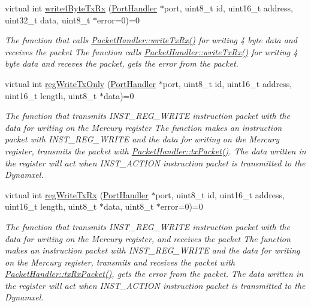 \begin{DoxyCompactItemize}
virtual int \hyperlink{classmercury_1_1_packet_handler_acd4df6583fcbaf872a4aba6623c9b084}{write4\+Byte\+Tx\+Rx} (\hyperlink{classmercury_1_1_port_handler}{Port\+Handler} $\ast$port, uint8\+\_\+t id, uint16\+\_\+t address, uint32\+\_\+t data, uint8\+\_\+t $\ast$error=0)=0
\begin{DoxyCompactList}\small\item\em The function that calls \hyperlink{classmercury_1_1_packet_handler_adf35a5000d465bd5426530e34a91a21d}{Packet\+Handler\+::write\+Tx\+Rx()} for writing 4 byte data and receives the packet  The function calls \hyperlink{classmercury_1_1_packet_handler_adf35a5000d465bd5426530e34a91a21d}{Packet\+Handler\+::write\+Tx\+Rx()} for writing 4 byte data and receves the packet,  gets the error from the packet. \end{DoxyCompactList}\item 
virtual int \hyperlink{classmercury_1_1_packet_handler_a0b0daaabd6473e14b2fbfbbf3260bc7b}{reg\+Write\+Tx\+Only} (\hyperlink{classmercury_1_1_port_handler}{Port\+Handler} $\ast$port, uint8\+\_\+t id, uint16\+\_\+t address, uint16\+\_\+t length, uint8\+\_\+t $\ast$data)=0
\begin{DoxyCompactList}\small\item\em The function that transmits I\+N\+S\+T\+\_\+\+R\+E\+G\+\_\+\+W\+R\+I\+TE instruction packet with the data for writing on the Mercury register  The function makes an instruction packet with I\+N\+S\+T\+\_\+\+R\+E\+G\+\_\+\+W\+R\+I\+TE and the data for writing on the Mercury register,  transmits the packet with \hyperlink{classmercury_1_1_packet_handler_acc3f84f0d952dc2d827d8500de512abe}{Packet\+Handler\+::tx\+Packet()}.  The data written in the register will act when I\+N\+S\+T\+\_\+\+A\+C\+T\+I\+ON instruction packet is transmitted to the Dynamxel. \end{DoxyCompactList}\item 
virtual int \hyperlink{classmercury_1_1_packet_handler_a9944f0271cdcc637429b678a3cd73273}{reg\+Write\+Tx\+Rx} (\hyperlink{classmercury_1_1_port_handler}{Port\+Handler} $\ast$port, uint8\+\_\+t id, uint16\+\_\+t address, uint16\+\_\+t length, uint8\+\_\+t $\ast$data, uint8\+\_\+t $\ast$error=0)=0
\begin{DoxyCompactList}\small\item\em The function that transmits I\+N\+S\+T\+\_\+\+R\+E\+G\+\_\+\+W\+R\+I\+TE instruction packet with the data for writing on the Mercury register, and receives the packet  The function makes an instruction packet with I\+N\+S\+T\+\_\+\+R\+E\+G\+\_\+\+W\+R\+I\+TE and the data for writing on the Mercury register,  transmits and receives the packet with \hyperlink{classmercury_1_1_packet_handler_ac7ceeaec210827d119199144badaad3a}{Packet\+Handler\+::tx\+Rx\+Packet()},  gets the error from the packet.  The data written in the register will act when I\+N\+S\+T\+\_\+\+A\+C\+T\+I\+ON instruction packet is transmitted to the Dynamxel. \end{DoxyCompactList}\item 

\end{DoxyCompactItemize}
